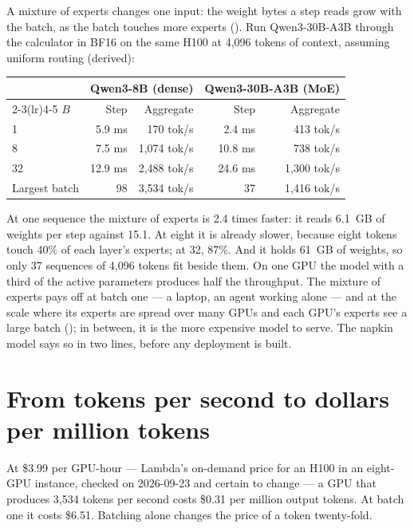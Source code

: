 A mixture of experts changes one input: the weight bytes a step reads grow with
the batch, as the batch touches more experts (). Run
Qwen3-30B-A3B through the calculator in BF16 on the same H100 at 4,096 tokens of
context, assuming uniform routing (derived):

\begin{center}\small
\begin{tabular}{@{}lrrrr@{}}
\toprule
 & \multicolumn{2}{c}{Qwen3-8B (dense)} & \multicolumn{2}{c}{Qwen3-30B-A3B (MoE)} \\
\cmidrule(lr){2-3}\cmidrule(lr){4-5}
$B$ & Step & Aggregate & Step & Aggregate \\
\midrule
1 & 5.9 ms & 170 tok/s & 2.4 ms & 413 tok/s \\
8 & 7.5 ms & 1,074 tok/s & 10.8 ms & 738 tok/s \\
32 & 12.9 ms & 2,488 tok/s & 24.6 ms & 1,300 tok/s \\
Largest batch & 98 & 3,534 tok/s & 37 & 1,416 tok/s \\
\bottomrule
\end{tabular}
\end{center}

\noindent At one sequence the mixture of experts is 2.4 times faster: it reads
6.1~GB of weights per step against 15.1. At eight it is already slower, because
eight tokens touch 40\% of each layer's experts; at 32, 87\%. And it holds 61~GB
of weights, so only 37 sequences of 4,096 tokens fit beside them. On one GPU the
model with a third of the active parameters produces half the throughput. The
mixture of experts pays off at batch one --- a laptop, an agent working alone ---
and at the scale where its experts are spread over many GPUs and each GPU's
experts see a large batch (); in between, it is the
more expensive model to serve. The napkin model says so in two lines, before any
deployment is built.

\section{From tokens per second to dollars per million tokens}

At \$3.99 per GPU-hour --- Lambda's on-demand price for an H100 in an
eight-GPU instance, checked on 2026-09-23 and certain to change --- a GPU that
produces 3,534 tokens per second costs \$0.31 per million output tokens. At
batch one it costs \$6.51. Batching alone changes the price of a token
twenty-fold.

